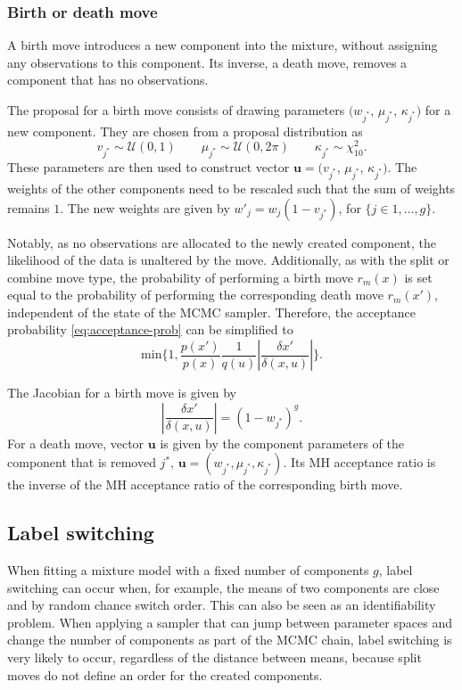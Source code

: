 \subsubsection{Birth or death move}
A birth move introduces a new component into the mixture, without assigning any observations to this component. Its inverse, a death move, removes a component that has no observations.

The proposal for a birth move consists of drawing parameters $(w_{j^*}$, $\mu_{j^*}$, $\kappa_{j^*})$ for a new component. They are chosen from a proposal distribution as
\begin{equation}
v_{j^*} \sim \mathcal{U}(0, 1) \qquad \mu_{j^*} \sim \mathcal{U}(0, 2\pi) \qquad \kappa_{j^*} \sim \chi^2_{10}.
\end{equation}
These parameters are then used to construct vector $\bm u = (v_{j^*}$, $\mu_{j^*}$, $\kappa_{j^*})$. The weights of the other components need to be rescaled such that the sum of weights remains $1$. The new weights are given by $w'_{j} = w_j(1-v_{j^*})$, for $\{ j \in 1, \dotsc, g \}$.

Notably, as no observations are allocated to the newly created component, the likelihood of the data is unaltered by the move. Additionally, as with the split or combine move type, the probability of performing a birth move $r_m(x)$ is set equal to the probability of performing the corresponding death move $r_m(x')$, independent of the state of the MCMC sampler. Therefore, the acceptance probability \eqref{eq:acceptance-prob} can be simplified to
\begin{equation}
\text{min} \bigg \{ 1, \frac{p(x')}{p(x)} \frac{1}{q(u)} \left| \frac{\delta x'}{\delta (x, u)} \right| \bigg \}.
\end{equation}

The Jacobian for a birth move is given by
\begin{equation}
\left| \frac{\delta x'}{\delta (x, u)} \right| = (1-w_{j^*})^g.
\end{equation}
For a death move, vector $\bm u$ is given by the component parameters of the component that is removed $j^*$, $\bm u = (w_{j^*}, \mu_{j^*}, \kappa_{j^*})$. Its MH acceptance ratio is the inverse of the MH acceptance ratio of the corresponding birth move.


\subsection{Label switching}
When fitting a mixture model with a fixed number of components $g$, label switching \citep{Jasra:2005ho} can occur when, for example, the means of two components are close and by random chance switch order. This can also be seen as an identifiability problem.
When applying a sampler that can jump between parameter spaces and change the number of components as part of the MCMC chain, label switching is very likely to occur, regardless of the distance between means, because split moves do not define an order for the created components.

